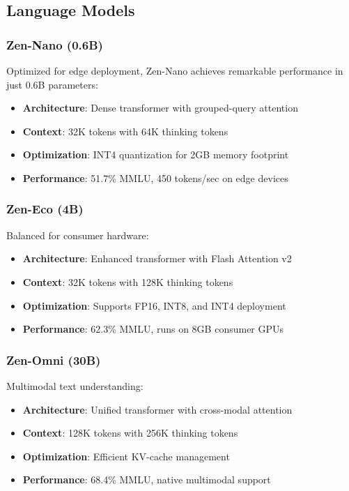 \documentclass[11pt,a4paper]{article}
\begin{document}
\subsection{Language Models}

\subsubsection{Zen-Nano (0.6B)}
Optimized for edge deployment, Zen-Nano achieves remarkable performance in just 0.6B parameters:
\begin{itemize}
    \item \textbf{Architecture}: Dense transformer with grouped-query attention
    \item \textbf{Context}: 32K tokens with 64K thinking tokens
    \item \textbf{Optimization}: INT4 quantization for 2GB memory footprint
    \item \textbf{Performance}: 51.7\% MMLU, 450 tokens/sec on edge devices
\end{itemize}

\subsubsection{Zen-Eco (4B)}
Balanced for consumer hardware:
\begin{itemize}
    \item \textbf{Architecture}: Enhanced transformer with Flash Attention v2
    \item \textbf{Context}: 32K tokens with 128K thinking tokens
    \item \textbf{Optimization}: Supports FP16, INT8, and INT4 deployment
    \item \textbf{Performance}: 62.3\% MMLU, runs on 8GB consumer GPUs
\end{itemize}

\subsubsection{Zen-Omni (30B)}
Multimodal text understanding:
\begin{itemize}
    \item \textbf{Architecture}: Unified transformer with cross-modal attention
    \item \textbf{Context}: 128K tokens with 256K thinking tokens
    \item \textbf{Optimization}: Efficient KV-cache management
    \item \textbf{Performance}: 68.4\% MMLU, native multimodal support
\end{itemize}
\end{document}
